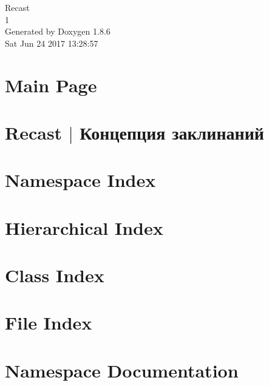 \documentclass[twoside]{book}
\newcommand{\clearemptydoublepage}{%
  \newpage{\pagestyle{empty}\cleardoublepage}%
}
\begin{document}
\hypersetup{pageanchor=false}
\begin{titlepage}
\vspace*{7cm}
\begin{center}%
{\Large Recast \\[1ex]\large 1 }\\
\vspace*{1cm}
{\large Generated by Doxygen 1.8.6}\\
\vspace*{0.5cm}
{\small Sat Jun 24 2017 13:28:57}\\
\end{center}
\end{titlepage}
\clearemptydoublepage
\tableofcontents
\clearemptydoublepage
{}
\hypersetup{pageanchor=true}

\chapter{Main Page}
\label{index}\hypertarget{index}{}
\chapter{Recast $\vert$ Концепция заклинаний}
\label{md_custom-docs__nodes}
\hypertarget{md_custom-docs__nodes}{}

\chapter{Namespace Index}

\chapter{Hierarchical Index}

\chapter{Class Index}

\chapter{File Index}

\chapter{Namespace Documentation}
























\end{document}
